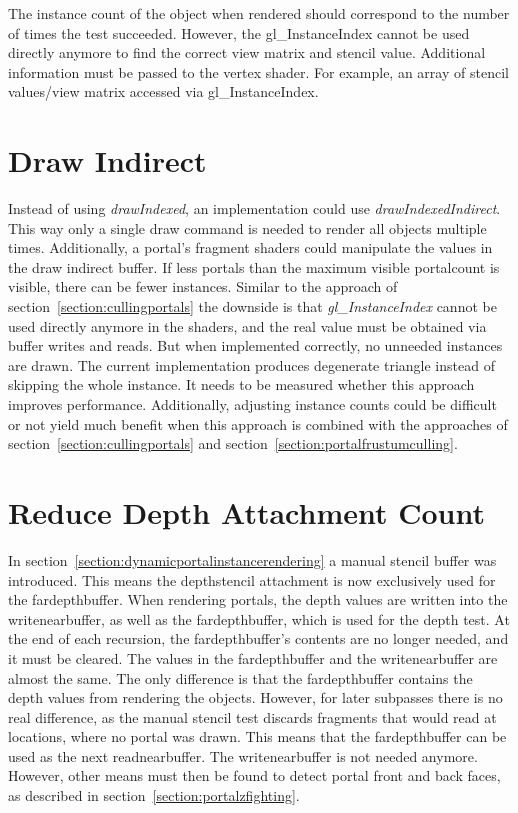 The instance count of the object when rendered should correspond to the number of times the test succeeded. However, the gl\_InstanceIndex cannot be used directly anymore to find the correct view matrix and stencil value. Additional information must be passed to the vertex shader. For example, an array of stencil values/view matrix accessed via gl\_InstanceIndex.

\section{Draw Indirect}
Instead of using \textit{drawIndexed}, an implementation could use \textit{drawIndexedIndirect}. This way only a single draw command is needed to render all objects multiple times. Additionally, a portal's fragment shaders could manipulate the values in the draw indirect buffer. If less portals than the maximum visible \gls{portalcount} is visible, there can be fewer instances. Similar to the approach of section~\ref{section:cullingportals} the downside is that \textit{gl\_InstanceIndex} cannot be used directly anymore in the shaders, and the real value must be obtained via buffer writes and reads. But when implemented correctly, no unneeded instances are drawn. The current implementation produces degenerate triangle instead of skipping the whole instance. It needs to be measured whether this approach improves performance. Additionally, adjusting instance counts could be difficult or not yield much benefit when this approach is combined with the approaches of section~\ref{section:cullingportals} and section~\ref{section:portalfrustumculling}.

\section{Reduce Depth Attachment Count}

In section~\ref{section:dynamicportalinstancerendering} a manual stencil buffer was introduced. This means the depthstencil attachment is now exclusively used for the \gls{fardepthbuffer}. When rendering portals, the depth values are written into the \gls{writenearbuffer}, as well as the \gls{fardepthbuffer}, which is used for the depth test. At the end of each recursion, the \gls{fardepthbuffer}'s contents are no longer needed, and it must be cleared. The values in the \gls{fardepthbuffer} and the  \gls{writenearbuffer} are almost the same. The only difference is that the \gls{fardepthbuffer} contains the depth values from rendering the objects. However, for later subpasses there is no real difference, as the manual stencil test discards fragments that would read at locations, where no portal was drawn. This means that the \gls{fardepthbuffer} can be used as the next \gls{readnearbuffer}. The \gls{writenearbuffer} is not needed anymore. However, other means must then be found to detect portal front and back faces, as described in section~\ref{section:portalzfighting}.

